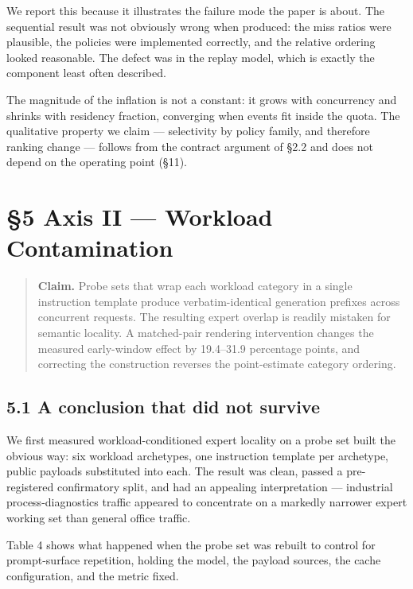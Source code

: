 \documentclass[
  10pt,
  letterpaper,
  10pt]{article}
\begin{document}
We report this because it illustrates the failure mode the paper is
about. The sequential result was not obviously wrong when produced: the
miss ratios were plausible, the policies were implemented correctly, and
the relative ordering looked reasonable. The defect was in the replay
model, which is exactly the component least often described.

The magnitude of the inflation is not a constant: it grows with
concurrency and shrinks with residency fraction, converging when events
fit inside the quota. The qualitative property we claim --- selectivity
by policy family, and therefore ranking change --- follows from the
contract argument of §2.2 and does not depend on the operating point
(§11).

\section{§5 Axis II --- Workload
Contamination}\label{axis-ii-workload-contamination}

\begin{quote}
\textbf{Claim.} Probe sets that wrap each workload category in a single
instruction template produce verbatim-identical generation prefixes
across concurrent requests. The resulting expert overlap is readily
mistaken for semantic locality. A matched-pair rendering intervention
changes the measured early-window effect by 19.4--31.9 percentage
points, and correcting the construction reverses the point-estimate
category ordering.
\end{quote}

\subsection{5.1 A conclusion that did not
survive}\label{a-conclusion-that-did-not-survive}

We first measured workload-conditioned expert locality on a probe set
built the obvious way: six workload archetypes, one instruction template
per archetype, public payloads substituted into each. The result was
clean, passed a pre-registered confirmatory split, and had an appealing
interpretation --- industrial process-diagnostics traffic appeared to
concentrate on a markedly narrower expert working set than general
office traffic.

Table 4 shows what happened when the probe set was rebuilt to control
for prompt-surface repetition, holding the model, the payload sources,
the cache configuration, and the metric fixed.
\end{document}
